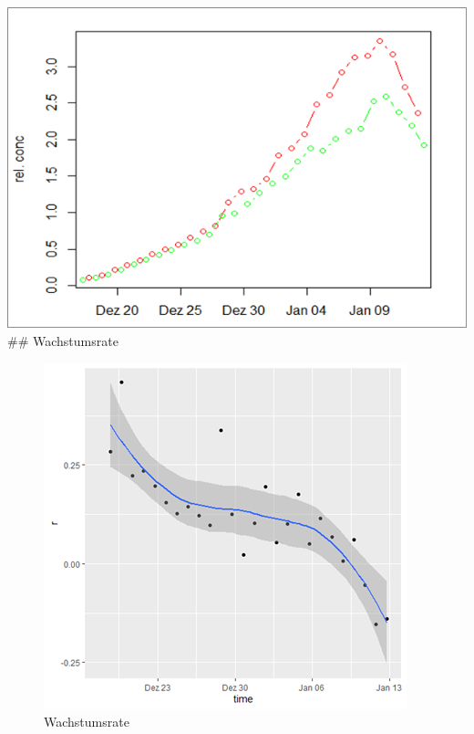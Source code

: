 \documentclass[
]{article}
\begin{document}
\includegraphics{Wachstumskurve Vorversuch 3.png} \#\# Wachstumsrate

\begin{figure}
\centering
\includegraphics{Wachstumsrate.png}
\caption{Wachstumsrate}
\end{figure}
\end{document}
